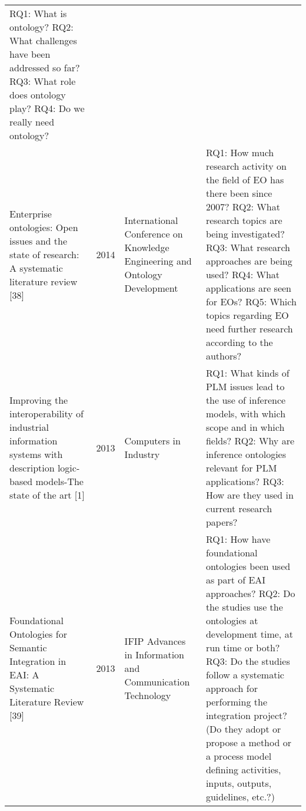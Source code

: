 \documentclass[peerreview]{IEEEtran}
\begin{document}
\begin{table*}
\begin{tabular}{p{5cm} p{1cm} p{4cm} p{5cm}}
RQ1: What is ontology? \newline
RQ2: What challenges have been addressed so far? \newline
RQ3: What role does ontology play? \newline
RQ4: Do we really need ontology? \\
Enterprise ontologies: Open issues and the state of research: A systematic literature review \cite{}[38] & 2014 & International Conference on Knowledge Engineering and Ontology Development & 
RQ1: How much research activity on the field of EO has there been since 2007? \newline
RQ2: What research topics are being investigated? \newline
RQ3: What research approaches are being used? \newline
RQ4: What applications are seen for EOs? \newline
RQ5: Which topics regarding EO need further research according to the authors? \\
Improving the interoperability of industrial information systems with description logic-based models-The state of the art [1] & 2013 & Computers in Industry & RQ1: What kinds of PLM issues lead to the use of inference models, with which scope and in which fields? \newline
RQ2: Why are inference ontologies relevant for PLM applications? \newline
RQ3: How are they used in current research papers? \\
Foundational Ontologies for Semantic Integration in EAI: A Systematic Literature Review \cite{}[39] & 2013 & IFIP Advances in Information and Communication Technology & RQ1: How have foundational ontologies been used as part of EAI approaches? \newline
RQ2: Do the studies use the ontologies at development time, at run time or both? \newline
RQ3: Do the studies follow a systematic approach for performing the integration project? (Do they adopt or propose a method or a process model defining activities, inputs, outputs, guidelines, etc.?)
    \\\hline
    
\end{tabular}
\end{table*}
\end{document}
